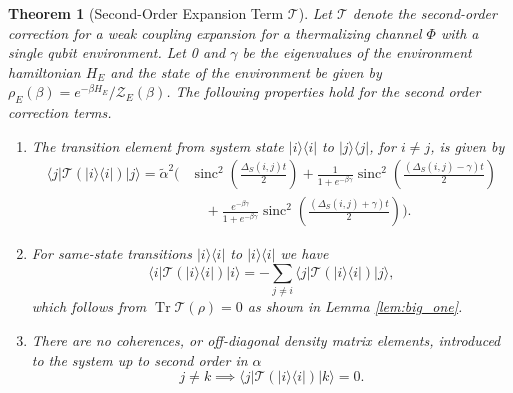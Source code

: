 \documentclass{article}
\newtheorem{theorem}{Theorem}
\newcommand{\on}{\rm on}
\newcommand{\off}{\rm off}
\newcommand{\ket}[1]{|#1\rangle}
\newcommand{\bra}[1]{\langle #1|}
\newcommand{\ketbra}[2]{| #1\rangle\! \langle #2|}
\DeclareMathOperator{\Tr}{Tr}
\newcommand{\partfun}{\mathcal{Z}}
\DeclareMathOperator{\sinc}{sinc}
\begin{document}
\begin{theorem}[Second-Order Expansion Term $\mathcal{T}$] \label{thm:second_order_transition}
Let $\mathcal{T}$ denote the second-order correction for a weak coupling expansion for a thermalizing channel $\Phi$ with a single qubit environment. Let 0 and $\gamma$ be the eigenvalues of the environment hamiltonian $H_E$ and the state of the environment be given by $\rho_E(\beta) = e^{-\beta H_E} / \partfun_E(\beta)$. The following properties hold for the second order correction terms.
\begin{enumerate}
    \item 
The transition element from system state $\ketbra{i}{i}$ to $\ketbra{j}{j}$, for $i \neq j$, is given by
\begin{align}
    \bra{j}\mathcal{T}(\ketbra{i}{i}) \ket{j} = \widetilde{\alpha}^2 \Biggr(& \sinc^2 \left( \frac{\Delta_S(i,j)t}{2} \right) + \frac{1}{1 + e^{-\beta \gamma}} \sinc^2 \left( \frac{(\Delta_S(i,j) - \gamma)t}{2} \right) \nonumber\\
    &\quad+  \frac{e^{-\beta \gamma}}{1 + e^{-\beta \gamma}} \sinc^2 \left( \frac{(\Delta_S(i,j) + \gamma)t}{2} \right) \Biggr). \label{eq:transition_terms_total}
\end{align}
\item For same-state transitions $\ketbra{i}{i}$ to $\ketbra{i}{i}$ we have
\begin{equation}
    \bra{i}\mathcal{T}(\ketbra{i}{i})\ket{i} = - \sum_{j \neq i} \bra{j} \mathcal{T}(\ketbra{i}{i}) \ket{j},
\end{equation}
which follows from $\Tr \mathcal{T}(\rho) = 0$ as shown in Lemma \ref{lem:big_one}. 
\item There are no coherences, or off-diagonal density matrix elements, introduced to the system up to second order in $\alpha$
\begin{equation}
    j \neq k \implies \bra{j} \mathcal{T}(\ketbra{i}{i}) \ket{k} = 0.
\end{equation}

\end{enumerate}
\end{theorem}
\end{document}
